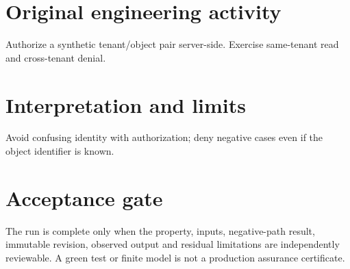 \documentclass[10pt,letterpaper]{article}
\begin{document}
\section{Original engineering activity}
Authorize a synthetic tenant/object pair server-side. Exercise same-tenant read and cross-tenant denial.
\section{Interpretation and limits}
Avoid confusing identity with authorization; deny negative cases even if the object identifier is known.
\section{Acceptance gate}
The run is complete only when the property, inputs, negative-path result, immutable revision, observed output and residual limitations are independently reviewable. A green test or finite model is not a production assurance certificate.
\end{document}
